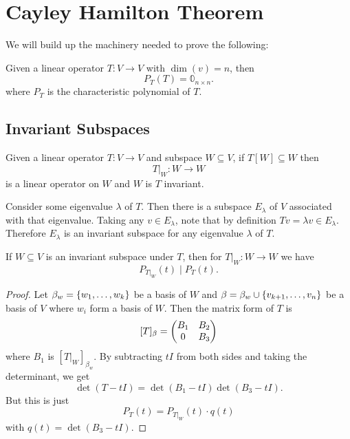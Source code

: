 \documentclass{subfiles}
\begin{document}
\chapter{Cayley Hamilton Theorem}

We will build up the machinery needed to prove the following:

\begin{theorem}
    Given a linear operator $T : V \to V$ with $\dim(v) = n$, then
    \[
        P_T(T) = \mathbb{0}_{n\times n}
    .\]
    where $P_T$ is the characteristic polynomial of $T$.
    \addproofref
\end{theorem}

\section{Invariant Subspaces}

\begin{definition}
    Given a linear operator $T : V \to V$ and subspace $W \subseteq V$, if $T[W] \subseteq W$ then
    \[
        T |_W : W \to W
    \]
    is a linear operator on $W$ and $W$ is $T$ invariant.
\end{definition}

\begin{example}
    Consider some eigenvalue $\lambda$ of $T$. Then there is a subspace $E_\lambda$ of $V$ associated with that eigenvalue. Taking any $v \in E_\lambda$, note that by definition $Tv = \lambda v \in E_\lambda$. Therefore $E_\lambda$ is an invariant subspace for any eigenvalue $\lambda$ of $T$.
\end{example}

\begin{theorem}
    If $W \subseteq V$ is an invariant subspace under $T$, then for $T |_W : W \to W$ we have
    \[
        P_{T|_W}(t) \;\vert\; P_T(t)
    .\]
\end{theorem}

\begin{proof}
    Let $\beta_w = \qty{w_1, \ldots, w_k}$ be a basis of $W$ and $\beta = \beta_w \cup \qty{v_{k+1}, \ldots, v_n}$ be a basis of $V$ where $w_i$ form a basis of $W$. Then the matrix form of $T$ is
    \[
        [T]_\beta = \mqty(
        B_{1} & B_2 \\
        0 & B_3
        )
    \]
    where $B_1$ is $[T|_W]_{\beta_w}$. By subtracting $t I$ from both sides and taking the determinant, we get
    \[
        \det(T - tI) = \det(B_1 - tI) \det(B_3 - tI)
    .\]
    But this is just
    \[
        P_T(t) = P_{T|_W}(t) \cdot q(t)
    \]
    with $q(t) = \det(B_3 - t I)$.
\end{proof}
\end{document}
